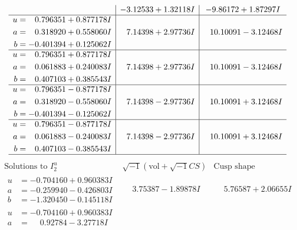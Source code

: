 \documentclass[1p]{elsarticle_modified}
\theoremstyle{definition}
\newcommand{\I}{\sqrt{-1}}
\begin{document}
$$\begin{array}{c|c|c}
 & -3.12533 + 1.32118 I & -9.86172 + 1.87297 I \\ \hline\begin{aligned}
u &= \phantom{-}0.796351 + 0.877178 I \\
a &= \phantom{-}0.318920 + 0.558060 I \\
b &= -0.401394 + 0.125062 I\end{aligned}
 & \phantom{-}7.14398 + 2.97736 I & \phantom{-}10.10091 - 3.12468 I \\ \hline\begin{aligned}
u &= \phantom{-}0.796351 + 0.877178 I \\
a &= \phantom{-}0.061883 + 0.240083 I \\
b &= \phantom{-}0.407103 + 0.385543 I\end{aligned}
 & \phantom{-}7.14398 + 2.97736 I & \phantom{-}10.10091 - 3.12468 I \\ \hline\begin{aligned}
u &= \phantom{-}0.796351 - 0.877178 I \\
a &= \phantom{-}0.318920 - 0.558060 I \\
b &= -0.401394 - 0.125062 I\end{aligned}
 & \phantom{-}7.14398 - 2.97736 I & \phantom{-}10.10091 + 3.12468 I \\ \hline\begin{aligned}
u &= \phantom{-}0.796351 - 0.877178 I \\
a &= \phantom{-}0.061883 - 0.240083 I \\
b &= \phantom{-}0.407103 - 0.385543 I\end{aligned}
 & \phantom{-}7.14398 - 2.97736 I & \phantom{-}10.10091 + 3.12468 I\\
 \hline 
 \end{array}$$\newpage$$\begin{array}{c|c|c}  
\text{Solutions to }I^u_{2}& \I (\text{vol} + \sqrt{-1}CS) & \text{Cusp shape}\\
 \hline 
\begin{aligned}
u &= -0.704160 + 0.960383 I \\
a &= -0.259940 - 0.426803 I \\
b &= -1.320450 - 0.145118 I\end{aligned}
 & \phantom{-}3.75387 - 1.89878 I & \phantom{-}5.76587 + 2.06655 I \\ \hline\begin{aligned}
u &= -0.704160 + 0.960383 I \\
a &= \phantom{-}0.92784 - 3.27718 I \\

\end{aligned}
\end{array}$$
\end{document}

